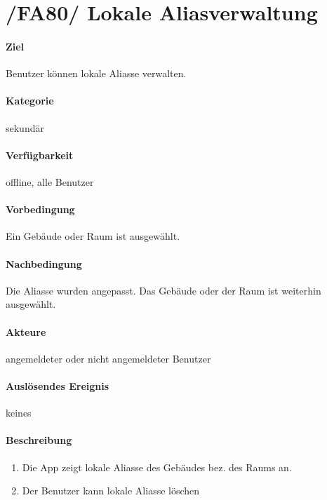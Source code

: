 \section{/FA80/ Lokale Aliasverwaltung}
\label{Lokale_Aliasverwaltung}
\label{/FA80/}
\paragraph{Ziel}
Benutzer können lokale Aliasse verwalten.
\paragraph{Kategorie}
sekundär
\paragraph{Verfügbarkeit}
offline, alle Benutzer
\paragraph{Vorbedingung}
Ein Gebäude oder Raum ist ausgewählt.
\paragraph{Nachbedingung}
Die Aliasse wurden angepasst. Das Gebäude oder der Raum ist weiterhin ausgewählt.
\paragraph{Akteure}
angemeldeter oder nicht angemeldeter Benutzer
\paragraph{Auslösendes Ereignis} keines
\paragraph{Beschreibung}
\begin{enumerate}
      \item Die App zeigt lokale Aliasse des Gebäudes bez. des Raums an.
      \item Der Benutzer kann lokale Aliasse löschen
\end{enumerate}